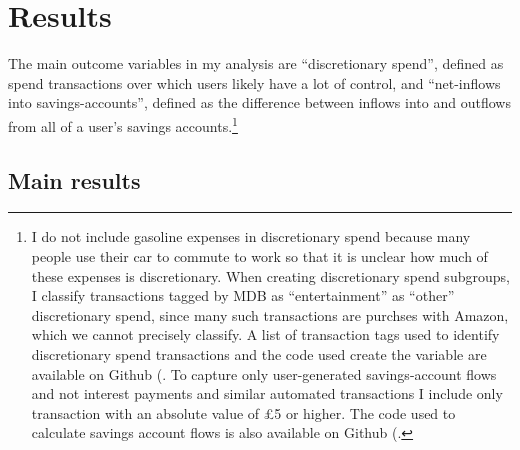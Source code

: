
\section{Results}%
\label{sec:results}

The main outcome variables in my analysis are ``discretionary spend'', defined
as spend transactions over which users likely have a lot of control, and
``net-inflows into savings-accounts'', defined as the difference between
inflows into and outflows from all of a user's savings accounts.\footnote{I do
    not include gasoline expenses in discretionary spend because many people
    use their car to commute to work so that it is unclear how much of these
    expenses is discretionary. When creating discretionary spend subgroups, I
    classify transactions tagged by MDB as ``entertainment'' as ``other''
    discretionary spend, since many such transactions are purchses with Amazon,
    which we cannot precisely classify. A list of transaction tags used to
    identify discretionary spend transactions and the code used create the
    variable are available on Github
    (\href{https://github.com/fabiangunzinger/mdb_eval/blob/f31bfcd7a330188cdd27968d41957ebf5b454099/src/data/aggregators.py#L389}{\faGithub}.
    To capture only user-generated savings-account flows and not interest
    payments and similar automated transactions I include only transaction with
an absolute value of \pounds5 or higher. The code used to calculate savings
account flows is also available on Github
(\href{https://github.com/fabiangunzinger/mdb_eval/blob/f31bfcd7a330188cdd27968d41957ebf5b454099/src/data/aggregators.py#L89}{\faGithub}.}


\subsection{Main results}%
\label{sub:main_results}

